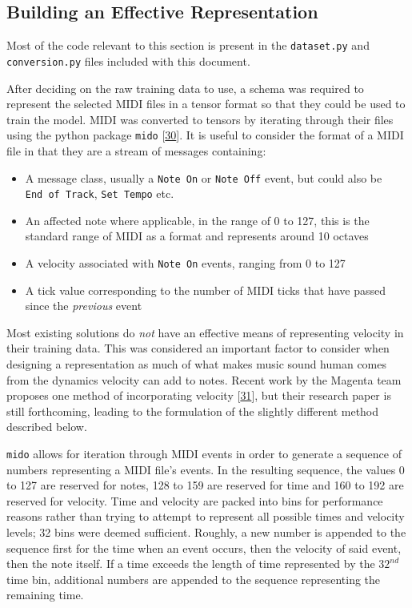 \documentclass[12pt,]{article}
\providecommand{\tightlist}{%
  \setlength{\itemsep}{0pt}\setlength{\parskip}{0pt}}
\begin{document}
\hypertarget{building-an-effective-representation}{%
\subsection{Building an Effective
Representation}\label{building-an-effective-representation}}

Most of the code relevant to this section is present in the
\texttt{dataset.py} and \texttt{conversion.py} files included with this
document.

After deciding on the raw training data to use, a schema was required to
represent the selected MIDI files in a tensor format so that they could
be used to train the model. MIDI was converted to tensors by iterating
through their files using the python package \texttt{mido}
{[}\protect\hyperlink{ref-mido}{30}{]}. It is useful to consider the
format of a MIDI file in that they are a stream of messages containing:

\begin{itemize}
\tightlist
\item
  A message class, usually a \texttt{Note\ On} or \texttt{Note\ Off}
  event, but could also be \texttt{End\ of\ Track}, \texttt{Set\ Tempo}
  etc.
\item
  An affected note where applicable, in the range of 0 to 127, this is
  the standard range of MIDI as a format and represents around 10
  octaves
\item
  A velocity associated with \texttt{Note\ On} events, ranging from 0 to
  127
\item
  A tick value corresponding to the number of MIDI ticks that have
  passed since the \emph{previous} event
\end{itemize}

Most existing solutions do \emph{not} have an effective means of
representing velocity in their training data. This was considered an
important factor to consider when designing a representation as much of
what makes music sound human comes from the dynamics velocity can add to
notes. Recent work by the Magenta team proposes one method of
incorporating velocity
{[}\protect\hyperlink{ref-performance-rnn-2017}{31}{]}, but their
research paper is still forthcoming, leading to the formulation of the
slightly different method described below.

\texttt{mido} allows for iteration through MIDI events in order to
generate a sequence of numbers representing a MIDI file's events. In the
resulting sequence, the values 0 to 127 are reserved for notes, 128 to
159 are reserved for time and 160 to 192 are reserved for velocity. Time
and velocity are packed into bins for performance reasons rather than
trying to attempt to represent all possible times and velocity levels;
32 bins were deemed sufficient. Roughly, a new number is appended to the
sequence first for the time when an event occurs, then the velocity of
said event, then the note itself. If a time exceeds the length of time
represented by the \(32^{nd}\) time bin, additional numbers are appended
to the sequence representing the remaining time.
\end{document}
